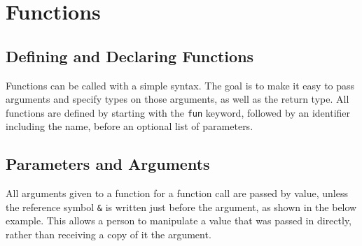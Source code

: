 \section{Functions}

\subsection{Defining and Declaring Functions}

Functions can be called with a simple syntax. The goal is to make it easy to pass arguments and specify types on those arguments, as well as the return type. All functions are defined by starting with the \lstinline|fun| keyword, followed by an identifier including the name, before an optional list of parameters.




\subsection{Parameters and Arguments}

All arguments given to a function for a function call are passed by value, unless the reference symbol \lstinline|&| is written just before the argument, as shown in the below example. This allows a person to manipulate a value that was passed in directly, rather than receiving a copy of it the argument.


